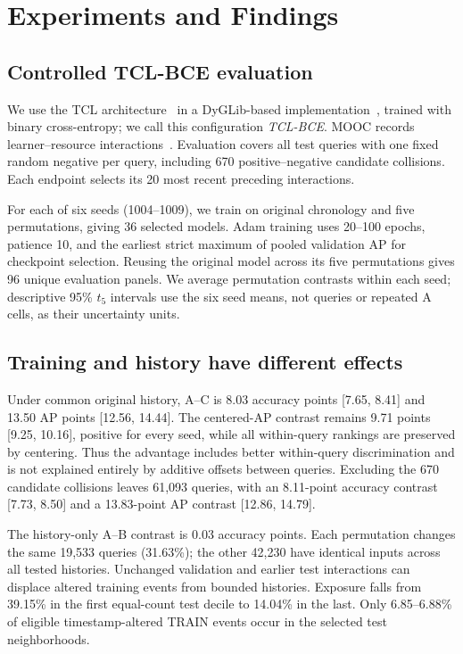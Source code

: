 \documentclass[sigconf,anonymous,review]{acmart}
\begin{document}
\section{Experiments and Findings}
\subsection{Controlled TCL-BCE evaluation}
We use the TCL architecture~\cite{wang2021tcl} in a DyGLib-based implementation~\cite{yu2023dygformer}, trained with binary cross-entropy; we call this configuration \emph{TCL-BCE}. MOOC records learner--resource interactions~\cite{kumar2019jodie}. Evaluation covers all \TCLQueries{} test queries with one fixed random negative per query, including 670 positive--negative candidate collisions. Each endpoint selects its 20 most recent preceding interactions.

For each of six seeds (1004--1009), we train on original chronology and five permutations, giving 36 selected models. Adam training uses 20--100 epochs, patience 10, and the earliest strict maximum of pooled validation AP for checkpoint selection. Reusing the original model across its five permutations gives 96 unique evaluation panels. We average permutation contrasts within each seed; descriptive 95\% $t_5$ intervals use the six seed means, not queries or repeated A cells, as their uncertainty units.

\subsection{Training and history have different effects}
Under common original history, A--C is 8.03 accuracy points [7.65, 8.41] and 13.50 AP points [12.56, 14.44]. The centered-AP contrast remains 9.71 points [9.25, 10.16], positive for every seed, while all within-query rankings are preserved by centering. Thus the advantage includes better within-query discrimination and is not explained entirely by additive offsets between queries. Excluding the 670 candidate collisions leaves 61,093 queries, with an 8.11-point accuracy contrast [7.73, 8.50] and a 13.83-point AP contrast [12.86, 14.79].

The history-only A--B contrast is 0.03 accuracy points. Each permutation changes the same 19,533 queries (31.63\%); the other 42,230 have identical inputs across all tested histories. Unchanged validation and earlier test interactions can displace altered training events from bounded histories. Exposure falls from 39.15\% in the first equal-count test decile to 14.04\% in the last. Only 6.85--6.88\% of eligible timestamp-altered TRAIN events occur in the selected test neighborhoods.
\end{document}
